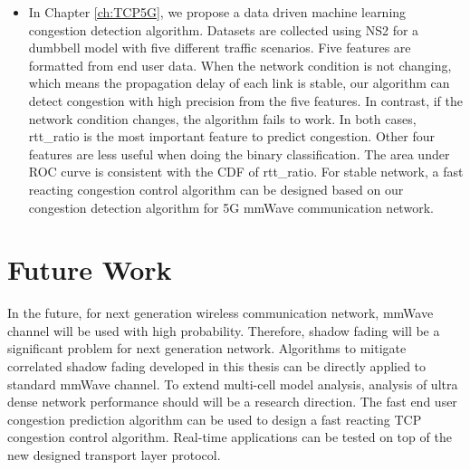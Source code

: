 \begin{itemize}
\item In Chapter \ref{ch:TCP5G}, we propose a data driven machine learning congestion detection algorithm. Datasets are collected using NS2 for a dumbbell model with five different traffic scenarios. Five features are formatted from end user data. When the network condition is not changing, which means the propagation delay of each link is stable, our algorithm can detect congestion with high precision from the five features. In contrast, if the network condition changes, the algorithm fails to work. In both cases, rtt\_ratio is the most important feature to predict congestion. Other four features are less useful when doing the binary classification. The area under ROC curve is consistent with the CDF of rtt\_ratio. For stable network, a fast reacting congestion control algorithm can be designed based on our congestion detection algorithm for 5G mmWave communication network.

\end{itemize}
\section{Future Work}
In the future, for next generation wireless communication network, mmWave channel will be used with high probability. Therefore, shadow fading will be a significant problem for next generation network. Algorithms to mitigate correlated shadow fading developed in this thesis can be directly applied to standard mmWave channel. To extend multi-cell model analysis, analysis of ultra dense network performance should will be a research direction. The fast end user congestion prediction algorithm can be used to design a fast reacting TCP congestion control algorithm. Real-time applications can be tested on top of the new designed transport layer protocol.